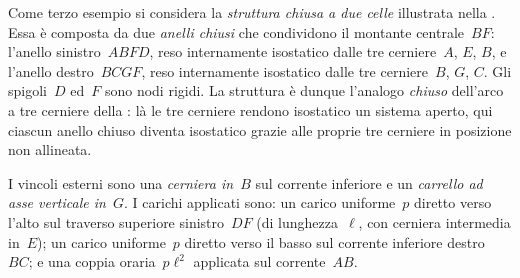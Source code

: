 Come terzo esempio si considera la \emph{struttura chiusa
	a due celle} illustrata nella .
Essa è composta da due \emph{anelli chiusi} che condividono
il montante centrale~$BF$: l'anello sinistro~$ABFD$, reso
internamente isostatico dalle tre cerniere~$A$, $E$, $B$,
e l'anello destro~$BCGF$, reso internamente isostatico
dalle tre cerniere~$B$, $G$, $C$. Gli spigoli~$D$ ed~$F$
sono nodi rigidi. La struttura è dunque l'analogo
\emph{chiuso} dell'arco a tre cerniere della
: là le tre cerniere rendono
isostatico un sistema aperto, qui ciascun anello chiuso
diventa isostatico grazie alle proprie tre cerniere in
posizione non allineata.

I vincoli esterni sono una \emph{cerniera in~$B$} sul
corrente inferiore e un \emph{carrello ad asse verticale
	in~$G$}. I carichi applicati sono: un carico uniforme~$p$
diretto verso l'alto sul traverso superiore sinistro~$DF$
(di lunghezza~$\ell$, con cerniera intermedia in~$E$);
un carico uniforme~$p$ diretto verso il basso sul corrente
inferiore destro~$BC$; e una coppia oraria~$p\ell^2$
applicata sul corrente~$AB$.

